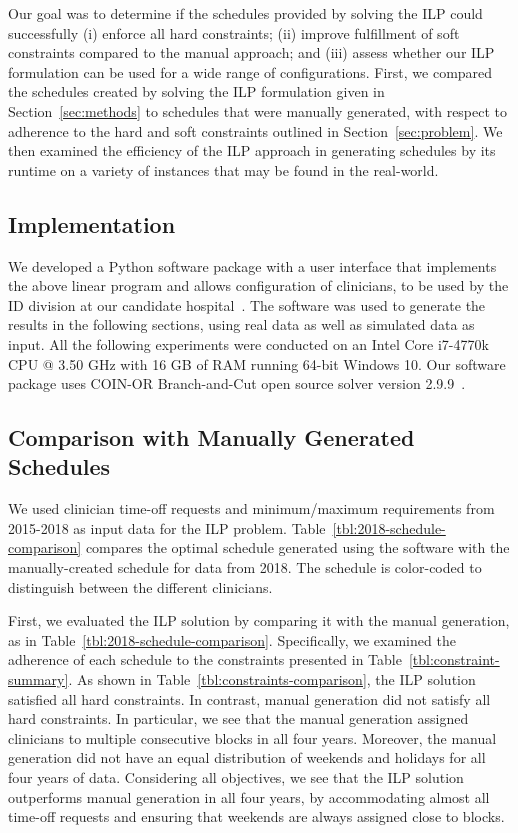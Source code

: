 Our goal was to determine if the schedules provided by solving the ILP 
could successfully
(i) enforce all hard constraints; 
(ii) improve fulfillment of soft constraints compared to the manual approach; 
and (iii) assess whether our ILP formulation can be used for a wide range
of configurations.
First, we compared the schedules created by solving the ILP formulation
given in Section~\ref{sec:methods} to schedules that were manually generated,
with respect to adherence to the hard and soft constraints outlined in Section~\ref{sec:problem}.
We then examined the efficiency of the ILP approach in generating schedules
by its runtime on a variety of instances that may be found in the real-world.

\subsection{Implementation}
We developed a Python software package with a user interface that implements the above
linear program and allows configuration of clinicians, to be
used by the ID division at our candidate hospital~\cite{landsman_scheduling}. 
The software was used to
generate the results in the following sections, using real data as well as
simulated data as input. All the following experiments were conducted on an
Intel Core i7-4770k CPU @ 3.50 GHz with 16 GB of RAM running 64-bit Windows 10.
Our software package uses COIN-OR Branch-and-Cut open source solver
version 2.9.9~\cite{johnjforrest_coin-or/cbc:_2019}.

\subsection{Comparison with Manually Generated Schedules}
We used clinician time-off requests and minimum/maximum requirements from
2015-2018 as input data for the ILP problem.
Table~\ref{tbl:2018-schedule-comparison} compares the optimal schedule generated using
the software with the manually-created schedule for data from 2018. The
schedule is color-coded to distinguish between the different clinicians.



First, we evaluated the ILP solution by comparing it with the
manual generation, as in Table~\ref{tbl:2018-schedule-comparison}. Specifically, we examined the adherence of each
schedule to the constraints presented in Table~\ref{tbl:constraint-summary}. As
shown in Table~\ref{tbl:constraints-comparison}, the ILP solution satisfied all 
hard constraints. In contrast,
manual generation did not satisfy all hard constraints. In
particular, we see that the manual generation assigned clinicians to multiple
consecutive blocks in all four years. Moreover, the manual generation did not have
an equal distribution of weekends and holidays for all four years of data.
Considering all objectives, we see that the ILP solution outperforms manual generation
in all four years, by accommodating almost all time-off requests and
ensuring that weekends are always assigned close to blocks.

